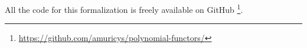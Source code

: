 All the code for this formalization is freely available on GitHub \footnote{\href{https://github.com/amuricys/polynomial-functors/}{https://github.com/amuricys/polynomial-functors/}}.










